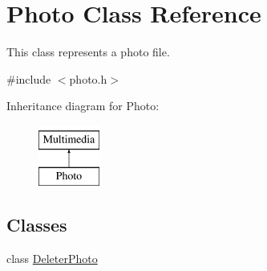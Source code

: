 \hypertarget{class_photo}{\section{Photo Class Reference}
\label{class_photo}
}


This class represents a photo file.  




{\ttfamily \#include $<$photo.\-h$>$}

Inheritance diagram for Photo\-:\begin{figure}[H]
\begin{center}
\leavevmode
\includegraphics[height=2.000000cm]{class_photo}
\end{center}
\end{figure}
\subsection*{Classes}
\begin{DoxyCompactItemize}
\item 
class \hyperlink{class_photo_1_1_deleter_photo}{Deleter\-Photo}
\end{DoxyCompactItemize}
